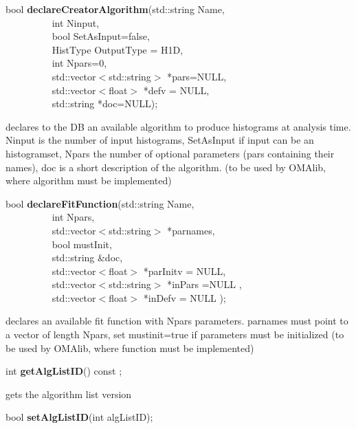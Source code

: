 \item    bool {\bf declareCreatorAlgorithm}(std::string Name,\\\mbox{}~~~~~~~~~ 
			       int Ninput,\\\mbox{}~~~~~~~~~
			       bool SetAsInput=false,\\\mbox{}~~~~~~~~~
			       HistType OutputType = H1D,\\\mbox{}~~~~~~~~~
			       int Npars=0,\\\mbox{}~~~~~~~~~ 
			       std::vector$<$std::string$>$ *pars=NULL,\\\mbox{}~~~~~~~~~
			       std::vector$<$float$>$ *defv = NULL,\\\mbox{}~~~~~~~~~
			       std::string *doc=NULL);

 declares to the DB an available algorithm to produce histograms at
 analysis time. Ninput is the number of input histograms, SetAsInput
 if input can be an histogramset, Npars the
 number of optional parameters (pars containing their names), doc is a short
 description of the algorithm.
 (to be used by OMAlib, where algorithm must be implemented)


\item    bool {\bf declareFitFunction}(std::string Name,\\\mbox{}~~~~~~~~~ 
                          int Npars,\\\mbox{}~~~~~~~~~
                          std::vector$<$std::string$>$ *parnames,\\\mbox{}~~~~~~~~~
                          bool mustInit,\\\mbox{}~~~~~~~~~
                          std::string \&doc,\\\mbox{}~~~~~~~~~
                          std::vector$<$float$>$ *parInitv = NULL,\\\mbox{}~~~~~~~~~
                          std::vector$<$std::string$>$ *inPars =NULL ,\\\mbox{}~~~~~~~~~
                          std::vector$<$float$>$ *inDefv = NULL );

 declares an available fit function with Npars parameters. parnames must point to a vector
 of length Npars, set mustinit=true if parameters must be initialized
 (to be used by OMAlib, where function must be implemented)


\item    int {\bf getAlgListID}() const ;

 gets the algorithm list version


\item    bool {\bf setAlgListID}(int algListID);


